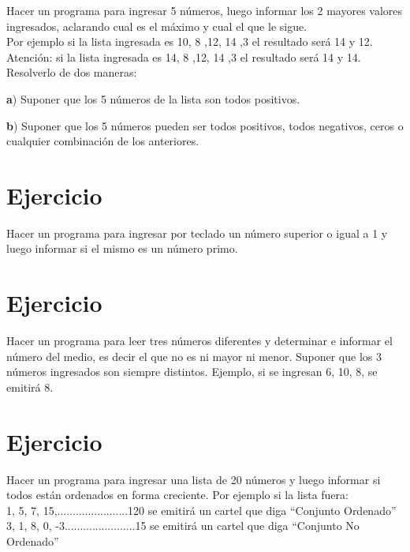 \documentclass[12pt,a4paper,twoside]{article}
\begin{document}
\hspace*{1cm} Hacer un programa para ingresar 5 números, luego informar los 2 mayores valores ingresados, aclarando cual es el máximo y cual el que le sigue.\\
Por ejemplo si la lista ingresada es 10, 8 ,12, 14 ,3 el resultado será 14 y 12.\\
Atención: si la lista ingresada es 14, 8 ,12, 14 ,3 el resultado será 14 y 14.\\
Resolverlo de dos maneras: 
\begin{list}{•}{}
\item \textbf{a}) Suponer que los 5 números de la lista son todos positivos. 
\item \textbf{b}) Suponer que los 5 números pueden ser todos positivos, todos negativos, ceros o cualquier  combinación de los anteriores.
\end{list}

\newpage

\section{Ejercicio }

\hspace*{1cm} Hacer un programa para ingresar por teclado un número superior o igual a 1 y luego informar si el mismo es un número primo. 

\newpage

\section{Ejercicio }

\hspace*{1cm} Hacer un programa para leer tres números diferentes y determinar e informar el número del medio, es decir el que no es ni mayor ni menor. Suponer que los 3 números ingresados son siempre distintos. Ejemplo, si se ingresan 6, 10, 8, se emitirá 8.

\newpage

\section{Ejercicio }

\hspace*{1cm}Hacer un programa para ingresar una lista de 20 números y luego informar si todos están ordenados en forma creciente. Por ejemplo si la lista fuera:\\
 1, 5, 7, 15,.......................120 se emitirá un cartel que diga “Conjunto Ordenado”\\
3, 1, 8, 0, -3.......................15 se emitirá un cartel que diga “Conjunto No Ordenado” 
\end{document}
